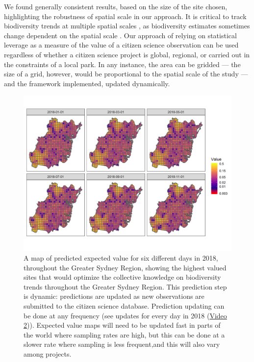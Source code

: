 \documentclass[9pt,twocolumn,twoside,lineno]{pnas-new}
\begin{document}
We found generally consistent results, based on the size of the site chosen, highlighting the robustness of spatial scale in our approach. It is critical to track biodiversity trends at multiple spatial scales \cite{soberon2007assessing}, as biodiversity estimates sometimes change dependent on the spatial scale \cite{chase2013scale}. Our approach of relying on statistical leverage as a measure of the value of a citizen science observation can be used regardless of whether a citizen science project is global, regional, or carried out in the constraints of a local park. In any instance, the area can be gridded --- the size of a grid, however, would be proportional to the spatial scale of the study --- and the framework implemented, updated dynamically.

\begin{figure}[!hb]
\centering
\includegraphics[width=.8\linewidth]{example_maps.png}
\caption{A map of predicted expected value for six different days in 2018, throughout the Greater Sydney Region, showing the highest valued sites that would optimize the collective knowledge on biodiversity trends throughout the Greater Sydney Region. This prediction step is dynamic: predictions are updated as new observations are submitted to the citizen science database. Prediction updating can be done at any frequency (see updates for every day in 2018 (\href{https://github.com/coreytcallaghan/optimize_citizen_science_obs/blob/master/Figures/dynamic_map.gif}{Video 2})). Expected value maps will need to be updated fast in parts of the world where sampling rates are high, but this can be done at a slower rate where sampling is less frequent,and this will also vary among projects.}
\label{fig3}
\end{figure}
\end{document}

